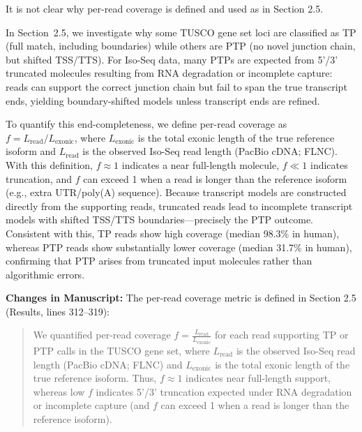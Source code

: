 \documentclass[11pt]{article}
\newcommand{\tuscoGeneSet}{TUSCO gene set}
\begin{document}
\begin{reviewercomment}
It is not clear why per-read coverage is defined and used as in Section 2.5.
\end{reviewercomment}

\begin{responseboxnew}
In Section~2.5, we investigate why some \tuscoGeneSet{} loci are classified as TP (full match, including boundaries) while others are PTP (no novel junction chain, but shifted TSS/TTS). For Iso-Seq data, many PTPs are expected from 5'/3' truncated molecules resulting from RNA degradation or incomplete capture: reads can support the correct junction chain but fail to span the true transcript ends, yielding boundary-shifted models unless transcript ends are refined.

To quantify this end-completeness, we define per-read coverage as $f = L_{\mathrm{read}}/L_{\mathrm{exonic}}$, where $L_{\mathrm{exonic}}$ is the total exonic length of the true reference isoform and $L_{\mathrm{read}}$ is the observed Iso-Seq read length (PacBio cDNA; FLNC). With this definition, $f \approx 1$ indicates a near full-length molecule, $f \ll 1$ indicates truncation, and $f$ can exceed 1 when a read is longer than the reference isoform (e.g., extra UTR/poly(A) sequence). Because transcript models are constructed directly from the supporting reads, truncated reads lead to incomplete transcript models with shifted TSS/TTS boundaries---precisely the PTP outcome. Consistent with this, TP reads show high coverage (median 98.3\% in human), whereas PTP reads show substantially lower coverage (median 31.7\% in human), confirming that PTP arises from truncated input molecules rather than algorithmic errors.

\vspace{0.3cm}
\textbf{Changes in Manuscript:} The per-read coverage metric is defined in Section 2.5 (Results, lines 312--319):
\begin{quote}
We quantified per-read coverage $f = \frac{L_{\mathrm{read}}}{L_{\mathrm{exonic}}}$ for each read supporting TP or PTP calls in the \tuscoGeneSet{}, where $L_{\mathrm{read}}$ is the observed Iso-Seq read length (PacBio cDNA; FLNC) and $L_{\mathrm{exonic}}$ is the total exonic length of the true reference isoform. Thus, $f \approx 1$ indicates near full-length support, whereas low $f$ indicates 5'/3' truncation expected under RNA degradation or incomplete capture (and $f$ can exceed 1 when a read is longer than the reference isoform).
\end{quote}
\end{responseboxnew}
\end{document}
